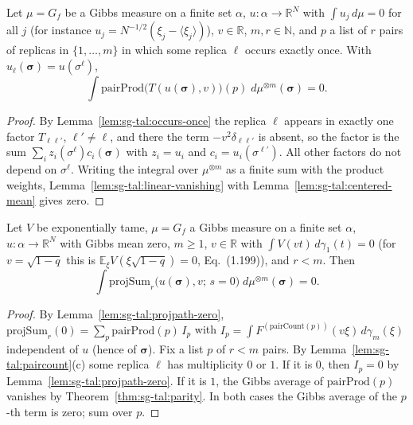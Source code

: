 \begin{theorem}
\label{thm:sg-tal:parity}
  \leanok
{}
Let $\mu=G_f$ be a Gibbs measure on a finite set $\alpha$, $u:\alpha\to\mathbb R^N$ with $\int u_j\,d\mu=0$ for all $j$ (for instance $u_j=N^{-1/2}(\xi_j-\langle\xi_j\rangle)$), $v\in\mathbb R$, $m,r\in\mathbb N$, and $p$ a list of $r$ pairs of replicas in $\{1,\dots,m\}$ in which some replica $\ell$ occurs exactly once.  With
$u_\ell(\boldsymbol\sigma)=u(\sigma^\ell)$,
\[
\int\mathrm{pairProd}\bigl(T(u(\boldsymbol\sigma),v)\bigr)(p)\;d\mu^{\otimes m}(\boldsymbol\sigma)=0 .
\]
\end{theorem}
\begin{proof}
  \leanok
By Lemma~\ref{lem:sg-tal:occurs-once} the replica $\ell$ appears in exactly one factor $T_{\ell\ell'}$, $\ell'\ne\ell$, and there the term $-v^2\delta_{\ell\ell'}$ is absent, so the factor is the sum
$\sum_iz_i(\sigma^\ell)c_i(\boldsymbol\sigma)$ with $z_i=u_i$ and $c_i=u_i(\sigma^{\ell'})$.  All other factors do not depend on $\sigma^\ell$.
Writing the integral over $\mu^{\otimes m}$ as a finite sum with the product weights, Lemma~\ref{lem:sg-tal:linear-vanishing} with Lemma~\ref{lem:sg-tal:centered-mean} gives zero.
\end{proof}

\begin{theorem}
\label{thm:sg-tal:projsum-vanish}
  \leanok
{}
Let $V$ be exponentially tame, $\mu=G_f$ a Gibbs measure on a finite set $\alpha$, $u:\alpha\to\mathbb R^N$ with Gibbs mean zero, $m\ge1$, $v\in\mathbb R$ with $\int V(vt)\,d\gamma_1(t)=0$ (for $v=\sqrt{1-q}$ this is
$\mathbb E_\xi V(\xi\sqrt{1-q})=0$, Eq.~(1.199)), and $r<m$.  Then
\[
\int\mathrm{projSum}_r\bigl(u(\boldsymbol\sigma),v;\,s=0\bigr)\;d\mu^{\otimes m}(\boldsymbol\sigma)=0 .
\]
\end{theorem}
\begin{proof}
  \leanok
By Lemma~\ref{lem:sg-tal:projpath-zero}, $\mathrm{projSum}_r(0)=\sum_p\mathrm{pairProd}(p)\,I_p$ with $I_p=\int F^{(\mathrm{pairCount}(p))}(v\xi)\,d\gamma_m(\xi)$ independent of $u$ (hence of $\boldsymbol\sigma$).
Fix a list $p$ of $r<m$ pairs.  By Lemma~\ref{lem:sg-tal:paircount}(c) some replica $\ell$ has multiplicity $0$ or $1$.  If it is $0$, then $I_p=0$ by Lemma~\ref{lem:sg-tal:projpath-zero}.  If it is $1$, the Gibbs average of
$\mathrm{pairProd}(p)$ vanishes by Theorem~\ref{thm:sg-tal:parity}.  In both cases the Gibbs average of the $p$-th term is zero; sum over $p$.
\end{proof}

